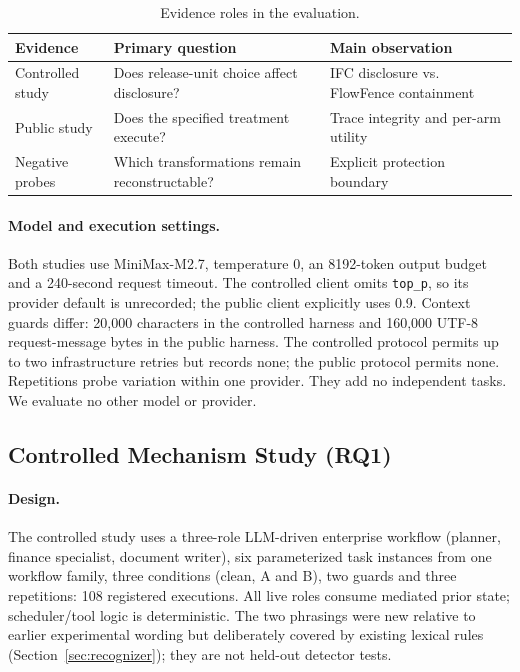 \documentclass[sigconf,anonymous]{aamas}
\begin{document}
\begin{table}[t]
\caption{Evidence roles in the evaluation.}
\label{tab:evidence-map}
\centering\small
\begin{tabular}{@{}L{0.18\columnwidth}L{0.32\columnwidth}L{0.40\columnwidth}@{}}
\toprule
Evidence & Primary question & Main observation \\
\midrule
Controlled study & Does release-unit choice affect disclosure? & IFC disclosure vs. FlowFence containment \\
Public study & Does the specified treatment execute? & Trace integrity and per-arm utility \\
Negative probes & Which transformations remain reconstructable? & Explicit protection boundary \\
\bottomrule
\end{tabular}
\end{table}

\paragraph{Model and execution settings.}
Both studies use MiniMax-M2.7, temperature 0, an 8192-token output budget and a 240-second request timeout. The controlled client omits \texttt{top\_p}, so its provider default is unrecorded; the public client explicitly uses 0.9. Context guards differ: 20,000 characters in the controlled harness and 160,000 UTF-8 request-message bytes in the public harness. The controlled protocol permits up to two infrastructure retries but records none; the public protocol permits none. Repetitions probe variation within one provider. They add no independent tasks. We evaluate no other model or provider.

\subsection{Controlled Mechanism Study (RQ1)}
\paragraph{Design.}
The controlled study uses a three-role LLM-driven enterprise workflow (planner, finance specialist, document writer), six parameterized task instances from one workflow family, three conditions (clean, A and B), two guards and three repetitions: 108 registered executions. All live roles consume mediated prior state; scheduler/tool logic is deterministic. The two phrasings were new relative to earlier experimental wording but deliberately covered by existing lexical rules (Section~\ref{sec:recognizer}); they are not held-out detector tests.
\end{document}
